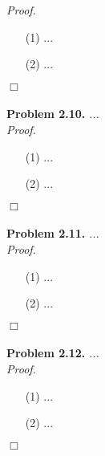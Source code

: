 \documentclass{article}
\begin{document}
\emph{Proof.}
\begin{enumerate}
\item[(1)]
  ...

\item[(2)]
  ...
\end{enumerate}
$\Box$ \\\\






\textbf{Problem 2.10.}
\emph{...} \\



\emph{Proof.}
\begin{enumerate}
\item[(1)]
  ...

\item[(2)]
  ...
\end{enumerate}
$\Box$ \\\\






\textbf{Problem 2.11.}
\emph{...} \\



\emph{Proof.}
\begin{enumerate}
\item[(1)]
  ...

\item[(2)]
  ...
\end{enumerate}
$\Box$ \\\\






\textbf{Problem 2.12.}
\emph{...} \\



\emph{Proof.}
\begin{enumerate}
\item[(1)]
  ...

\item[(2)]
  ...
\end{enumerate}
$\Box$ \\\\
\end{document}
